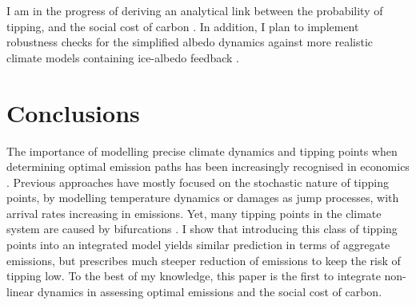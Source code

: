 \documentclass[12pt]{article}
\begin{document}
I am in the progress of deriving an analytical link between the probability of tipping, and the social cost of carbon \citep{grass_small-noise_2015}. In addition, I plan to implement robustness checks for the  simplified albedo dynamics against more realistic climate models containing ice-albedo feedback \citep{seaver_wang_mechanisms_2023}.

\section{Conclusions}


The importance of modelling precise climate dynamics and tipping points when determining optimal emission paths has been increasingly recognised in economics \citep{lontzek_stochastic_2015,dietz_are_2020, van_den_bremer_risk-adjusted_2021,dietz_economic_2021,taconet_social_2021}. Previous approaches have mostly focused on the stochastic nature of tipping points, by modelling temperature dynamics or damages as jump processes, with arrival rates increasing in emissions. Yet, many tipping points in the climate system are caused by bifurcations \citep{ashwin_tipping_2012, ashwin_extreme_2020}. I show that introducing this class of tipping points into an integrated model yields similar prediction in terms of aggregate emissions, but prescribes much steeper reduction of emissions to keep the risk of tipping low. To the best of my knowledge, this paper is the first to integrate non-linear dynamics in assessing optimal emissions and the social cost of carbon.

\newpage


\end{document}
